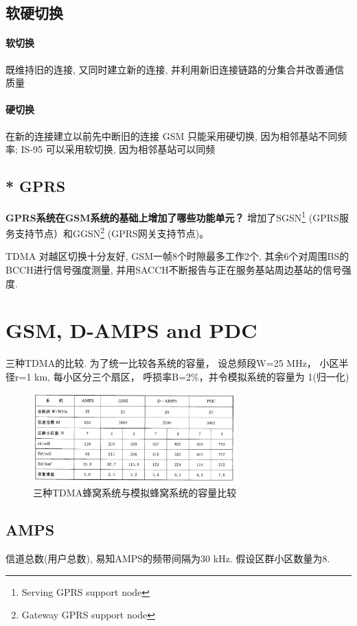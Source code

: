 \documentclass[a4paper]{report}
\begin{document}
\subsection{软硬切换}
\paragraph{软切换} 既维持旧的连接, 又同时建立新的连接, 并利用新旧连接链路的分集合并改善通信质量
\paragraph{硬切换} 在新的连接建立以前先中断旧的连接
GSM 只能采用硬切换, 因为相邻基站不同频率; IS-95 可以采用软切换, 因为相邻基站可以同频
\subsection{* GPRS}
\textbf{GPRS系统在GSM系统的基础上增加了哪些功能单元？}
增加了SGSN\footnote{Serving GPRS support node} (GPRS服务支持节点）和GGSN\footnote{Gateway GPRS support node} (GPRS网关支持节点)。



TDMA 对越区切换十分友好, GSM一帧8个时隙最多工作2个, 其余6个对周围BS的BCCH进行信号强度测量, 并用SACCH不断报告与正在服务基站周边基站的信号强度. 
\section{GSM, D-AMPS and PDC}
三种TDMA的比较. 为了统一比较各系统的容量， 设总频段W=25 MHz， 小区半径r=1 km, 每小区分三个扇区， 呼损率B=2\%，并令模拟系统的容量为 1(归一化)
\begin{figure}[H]
\centering
\includegraphics[width=0.7\textwidth]{tdma_cap.jpg}
\caption{三种TDMA蜂窝系统与模拟蜂窝系统的容量比较}
\end{figure}
\subsection{AMPS}
信道总数(用户总数), 易知AMPS的频带间隔为$30$ kHz. 假设区群小区数量为8. 
\end{document}
